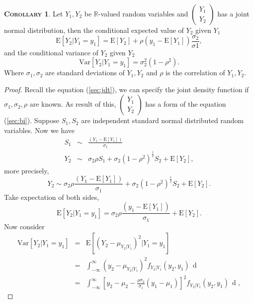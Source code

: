 \documentclass[a4paper, twoside, 11pt]{article}
\theoremstyle{definition}
\newtheorem{corollary}[definition]{\scshape Corollary}
\newcommand{\sqbr}[1]{\left[ {#1} \right]}
\begin{document}
\begin{corollary}
  Let $Y_1, Y_2$ be $\mathbb{R}$-valued random variables and $\left(
    \begin{array}{c}
      Y_1 \\
      Y_2
    \end{array}
	\right)$  has a joint normal distribution, then the conditional expected value of $Y_2$ given $Y_1$
    $$
	\mathrm{E}[Y_2| Y_1=y_1] = \mathrm{E}[Y_2] + \rho (y_1 - \mathrm{E}[Y_1])\frac{\sigma_2}{\sigma1},
	$$
	and the conditional variance of $Y_2$ given $Y_2$
	$$
		\mathrm{Var}[Y_2| Y_1 = y_1] = \sigma_2^2 (1 - \rho^2).
	$$
	Where $\sigma_1, \sigma_2$ are standard deviations of $Y_1, Y_2$ and $\rho$ is the correlation of $Y_1, Y_2$.
	\label{sec:condi}
\end{corollary}

\begin{proof}
  Recall the equation (\ref{sec:jdt}), we can specify the joint density function if $\sigma_1, \sigma_2, \rho$ are known. As result of this,
  $\left(
    \begin{array}{c}
      Y_1 \\
      Y_2
    \end{array}
	\right)$ has a form of the equation (\ref{sec:bi}).
  Suppose $S_1, S_2$ are independent standard normal distributed random variables. Now we have
  \begin{eqnarray*}
	S_1 &\sim& \frac{(Y_1 - \mathrm{E}[Y_1])}{\sigma_1} \\
	Y_2 &\sim& \sigma_2\rho S_1 + \sigma_2(1-\rho^2)^{\frac{1}{2}} S_2 + \mathrm{E}[Y_2],
  \end{eqnarray*}
  more precisely,
  $$
  Y_2 \sim \sigma_2\rho \frac{(Y_1 - \mathrm{E}[Y_1])}{\sigma_1}  + \sigma_2(1-\rho^2)^{\frac{1}{2}} S_2 + \mathrm{E}[Y_2].
  $$
  Take expectation of both sides, 
  \begin{equation*}
	\mathrm{E}[Y_2|Y_1=y_1] = \sigma_2\rho \frac{(y_1 - \mathrm{E}[Y_1])}{\sigma_1} + \mathrm{E}[Y_2].
  \end{equation*}
  Now consider
  \begin{eqnarray*}
	\mathrm{Var}[Y_2|Y_1=y_1] &=&  \mathrm{E}[(Y_2 - \mu_{Y_2|Y_1})^2|Y_1=y_1]\\
							  &=& \int_{-\infty}^{\infty}(y_2 - \mu_{Y_2|Y_1})^2f_{Y_2|Y_1}(y_2, y_1)\,\mathop{dy_2}\\
							  &=& \int_{-\infty}^{\infty}\sqbr{y_2 - \mu_2 - \frac{\rho\sigma_2}{\sigma_1}(y_1-\mu_1)}^2f_{Y_2|Y_1}(y_2, y_1)\,\mathop{dy_2},
  \end{eqnarray*}

\end{proof}
\end{document}
